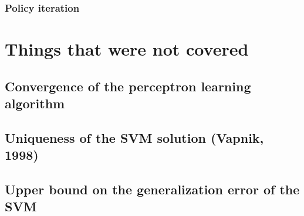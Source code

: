 \documentclass[11pt]{book} %
\begin{document}
\subsection{Policy iteration}


\chapter{Things that were not covered}

\section{Convergence of the perceptron learning algorithm}

\section{Uniqueness of the SVM solution (Vapnik, 1998)}

\section{Upper bound on the generalization error of the SVM}

\backmatter
\end{document}
